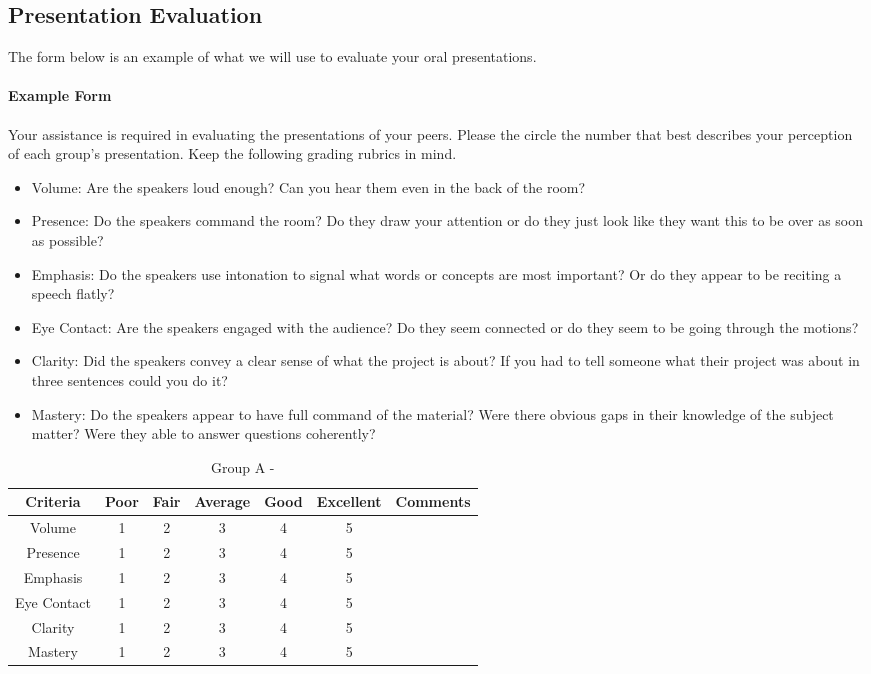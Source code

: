 \documentclass[10pt]{article}
\begin{document}
\newcommand{\grademe}[2]{
\begin{table}[h]
	\centering
	\begin{tabular}{|c|c|c|c|c|c|p{2.5in}|}
	\hline
	Criteria & Poor & Fair & Average & Good & Excellent & Comments \\
	\hline
	Volume 		& 1 & 2 & 3 & 4 & 5 & \\
	Presence 	& 1 & 2 & 3 & 4 & 5 & \\
	Emphasis 	& 1 & 2 & 3 & 4 & 5 & \\
	Eye Contact & 1 & 2 & 3 & 4 & 5 & \\
	Clarity 	& 1 & 2 & 3 & 4 & 5 & \\
	Mastery		& 1 & 2 & 3 & 4 & 5 & \\
	\hline
	\end{tabular}
	\caption{Group #1 - #2}
\end{table}
}

\subsection{Presentation Evaluation}

The form below is an example of what we will use to evaluate your oral presentations. 

\paragraph{Example Form}

Your assistance is required in evaluating the presentations of your peers. Please the circle the number that best describes your perception of each group's presentation. Keep the following grading rubrics in mind. 

\begin{itemize}
	\item Volume: Are the speakers loud enough? Can you hear them even in the back of the room? 
	\item Presence: Do the speakers command the room? Do they draw your attention or do they just look like they want this to be over as soon as possible?
	\item Emphasis: Do the speakers use intonation to signal what words or concepts are most important? Or do they appear to be reciting a speech flatly?
	\item Eye Contact: Are the speakers engaged with the audience? Do they seem connected or do they seem to be going through the motions?	
	\item Clarity: Did the speakers convey a clear sense of what the project is about? If you had to tell someone what their project was about in three sentences could you do it? 
	\item Mastery: Do the speakers appear to have full command of the material? Were there obvious gaps in their knowledge of the subject matter? Were they able to answer questions coherently? 	
\end{itemize}


\grademe{A}{}
\end{document}
